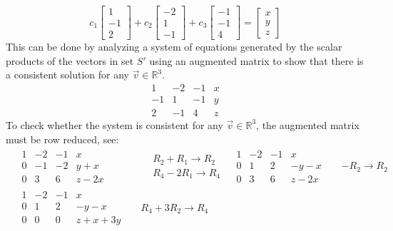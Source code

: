 \documentclass{report}
\begin{document}
$$
c_1 
\begin{bmatrix} 
1 \\
-1 \\
2
\end{bmatrix} +
c_2
\begin{bmatrix}
-2 \\
1 \\
-1
\end{bmatrix} +
c_3
\begin{bmatrix}
-1 \\
-1 \\
4
\end{bmatrix} =
\begin{bmatrix}
x \\
y \\
z
\end{bmatrix}
$$ 
This can be done by analyzing a system of equations generated by the scalar products of the vectors in set $S'$ using an augmented matrix to show that there is a consistent solution for any $\vec{v}\in\mathbb{R}^3$.
$$
\begin{array}{ccc|c}
	1 & -2 & -1 & x \\
	-1 & 1 & -1 & y \\
	2 & -1 & 4 & z
\end{array}
$$
To check whether the system is consistent for any $\vec{v}\in\mathbb{R}^3$,  the augmented matrix must be row reduced,  see:
\begin{align*}
	&\begin{array}{ccc|c}
		1 & -2 & -1 & x \\
		0 & -1 & -2 & y + x \\
		0 & 3 & 6 & z - 2x
	\end{array}
	&& \begin{aligned} & R_2 + R_1 \rightarrow R_2 \\ & R_4 - 2R_1 \rightarrow R_4 \end{aligned}
	&\begin{array}{ccc|c}
		1 & -2 & -1 & x \\
		0 & 1 & 2 & - y - x \\
		0 & 3 & 6 & z - 2x
	\end{array}
	&& -R_2 \rightarrow R_2 \\
	&\begin{array}{ccc|c}
		1 & -2 & -1 & x \\
		0 & 1 & 2 & - y - x \\
		0 & 0 & 0 & z + x + 3y
	\end{array}
	&& R_4 + 3R_2 \rightarrow R_4
\end{align*} 
\end{document}
